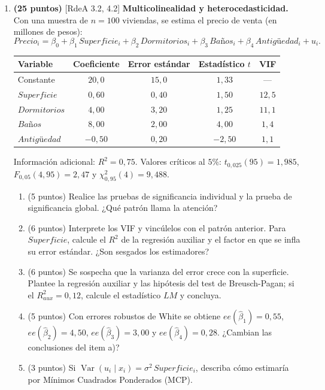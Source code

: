 \documentclass[12pt,letterpaper]{article}
\newcommand{\rdea}[1]{\textsf{\small [RdeA #1]}}
\DeclareMathOperator{\var}{Var}
\begin{document}
\begin{enumerate}
\item \textbf{(25 puntos)} \rdea{3.2, 4.2} \textbf{Multicolinealidad y heterocedasticidad.} Con una muestra de $n=100$ viviendas, se estima el precio de venta (en millones de pesos):
\[
Precio_i=\beta_0+\beta_1\,Superficie_i+\beta_2\,Dormitorios_i+\beta_3\,Baños_i+\beta_4\,Antigüedad_i+u_i .
\]

\begin{center}
\begin{tabular}{lcccc}
\hline
Variable & Coeficiente & Error estándar & Estadístico $t$ & VIF \\
\hline
Constante    & $20{,}0$ & $15{,}0$ & $1{,}33$ & --- \\
$Superficie$ & $0{,}60$ & $0{,}40$ & $1{,}50$ & $12{,}5$ \\
$Dormitorios$& $4{,}00$ & $3{,}20$ & $1{,}25$ & $11{,}1$ \\
$Baños$      & $8{,}00$ & $2{,}00$ & $4{,}00$ & $1{,}4$ \\
$Antigüedad$ & $-0{,}50$& $0{,}20$ & $-2{,}50$& $1{,}1$ \\
\hline
\end{tabular}
\end{center}

Información adicional: $R^2=0{,}75$. Valores críticos al $5\%$: $t_{0,025}(95)=1{,}985$, $F_{0,05}(4,95)=2{,}47$ y $\chi^2_{0,95}(4)=9{,}488$.

\begin{enumerate}[label=\alph*)]
    \item (5 puntos) Realice las pruebas de significancia individual y la prueba de significancia global. ¿Qué patrón llama la atención?
    \item (6 puntos) Interprete los VIF y vincúlelos con el patrón anterior. Para $Superficie$, calcule el $R^2$ de la regresión auxiliar y el factor en que se infla su error estándar. ¿Son sesgados los estimadores?
    \item (6 puntos) Se sospecha que la varianza del error crece con la superficie. Plantee la regresión auxiliar y las hipótesis del test de Breusch-Pagan; si el $R^2_{aux}=0{,}12$, calcule el estadístico $LM$ y concluya.
    \item (5 puntos) Con errores robustos de White se obtiene $ee(\hat\beta_1)=0{,}55$, $ee(\hat\beta_2)=4{,}50$, $ee(\hat\beta_3)=3{,}00$ y $ee(\hat\beta_4)=0{,}28$. ¿Cambian las conclusiones del item a)?
    \item (3 puntos) Si $\var(u_i\mid x_i)=\sigma^2\,Superficie_i$, describa cómo estimaría por Mínimos Cuadrados Ponderados (MCP).
\end{enumerate}


\end{enumerate}
\end{document}
